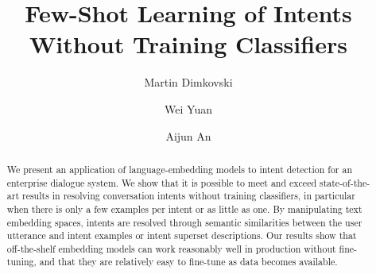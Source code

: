 \documentclass[sigconf, anonymous=true]{acmart}
\begin{document}
\title{Few-Shot Learning of Intents Without Training Classifiers}

\author{Martin Dimkovski}

\author{Wei Yuan}
\authornotemark[1]
\author{Aijun An}


\begin{abstract}
We present an application of language-embedding models to intent detection for an enterprise dialogue system. We show that it is possible to meet and exceed state-of-the-art results in resolving conversation intents without training classifiers, in particular when there is only a few examples per intent or as little as one. By manipulating text embedding spaces, intents are resolved through semantic similarities between the user utterance and intent examples or intent superset descriptions. Our results show that off-the-shelf embedding models can work reasonably well in production without fine-tuning, and that they are relatively easy to fine-tune as data becomes available. 
\end{abstract}
\end{document}
